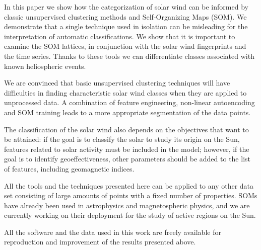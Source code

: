 In this paper we show how the categorization of solar wind can be informed by classic unsupervised clustering methods and Self-Organizing Maps (SOM). We demonstrate that a single technique used in isolation can be misleading for the interpretation of automatic classifications. We show that it is important to examine the SOM lattices, in conjunction with the solar wind fingerprints and the time series. Thanks to these tools we can differentiate classes associated with known heliospheric events.

We are convinced that basic unsupervised clustering techniques will have difficulties in finding characteristic solar wind classes when they are applied to unprocessed data. A combination of feature engineering, non-linear autoencoding and SOM training leads to a more appropriate segmentation of the data points.

The classification of the solar wind also depends on the objectives that want to be attained: if the goal is to classify the solar to study its origin on the Sun, features related to solar activity must be included in the model; however, if the goal is to identify geoeffectiveness, other parameters should be added to the list of features, including geomagnetic indices.

All the tools and the techniques presented here can be applied to any other data set consisting of large amounts of points with a fixed number of properties. SOMs have already been used in astrophysics\citep{Suveges2017} and magnetospheric physics\citep{Camporeale2018}, and we are currently working on their deployment for the study of active regions on the Sun.

All the software and the data used in this work are freely available for reproduction and improvement of the results presented above.
